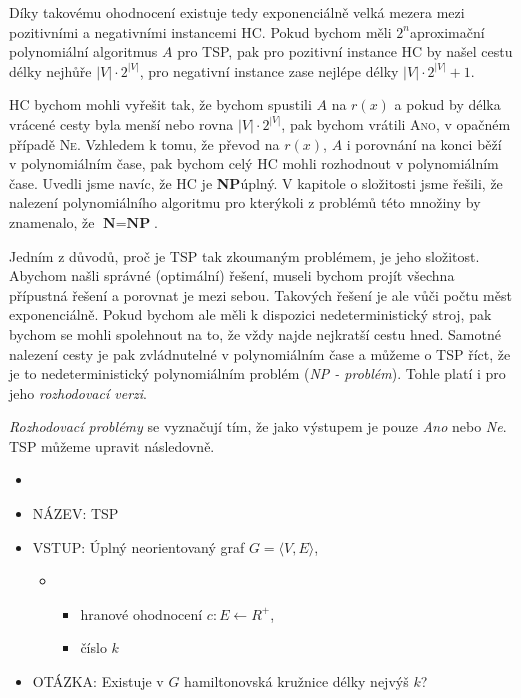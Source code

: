 \documentclass[
  biblatex,
  figures=false,
  glossaries,
  index
]{kidiplom}
\begin{document}
Díky takovému ohodnocení existuje tedy exponenciálně velká mezera mezi pozitivními a negativními instancemi HC. Pokud bychom měli $2^n$\textendash aproximační polynomiální algoritmus $A$ pro TSP, pak pro pozitivní instance HC by našel cestu délky nejhůře $|V|\cdot2^{|V|}$, pro negativní instance zase nejlépe délky $|V|\cdot2^{|V|} + 1$.

HC bychom mohli vyřešit tak, že bychom spustili $A$ na $r(x)$ a pokud by délka vrácené cesty byla menší nebo rovna $|V|\cdot2^{|V|}$, pak bychom vrátili \textsc{Ano}, v opačném případě \textsc{Ne}. Vzhledem k tomu, že převod na $r(x)$, $A$ i porovnání na konci běží v polynomiálním čase, pak bychom celý HC mohli rozhodnout v polynomiálním čase. Uvedli jsme navíc, že HC je \textbf{NP}\textendash úplný. V kapitole o složitosti jsme řešili, že nalezení polynomiálního algoritmu pro kterýkoli z problémů této množiny by znamenalo, že $\textbf{N} = \textbf{NP}$.


\pagebreak
Jedním z důvodů, proč je TSP tak zkoumaným problémem, je jeho složitost. Abychom našli správné (optimální) řešení, museli bychom projít všechna přípustná řešení a porovnat je mezi sebou. Takových řešení je ale vůči počtu měst exponenciálně. Pokud bychom ale měli k dispozici nedeterministický stroj, pak bychom se mohli spolehnout na to, že vždy najde nejkratší cestu hned. Samotné nalezení cesty je pak zvládnutelné v polynomiálním čase a můžeme o TSP říct, že je to nedeterministický polynomiálním problém (\textit{NP - problém}). Tohle platí i pro jeho \textit{rozhodovací verzi}.

\textit{Rozhodovací problémy} se vyznačují tím, že jako výstupem je pouze \textit{Ano} nebo \textit{Ne}. TSP můžeme upravit následovně.
\begin{definition}
\begin{itemize}[label={}]
  \item
  \item NÁZEV: TSP
  \item VSTUP: Úplný neorientovaný graf $G=\langle V, E \rangle$,
  \begin{itemize}[label={}]
  \item \begin{itemize}[label={}]
  \item hranové ohodnocení $c : E \leftarrow R^+$,
  \item číslo $k$
  \end{itemize}
  \end{itemize}
  \item OTÁZKA: Existuje v $G$ hamiltonovská kružnice délky nejvýš $k$?
\end{itemize}
\end{definition}
\end{document}
